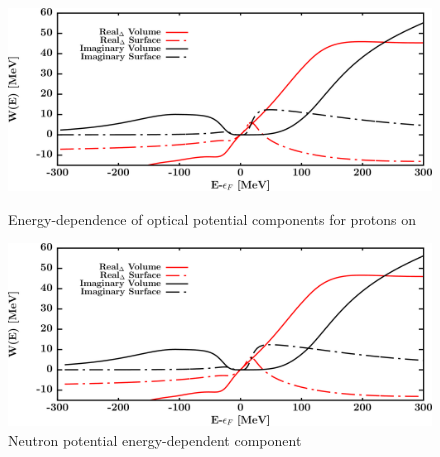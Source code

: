 \begin{figure}[H]
    \centering
    \begin{minipage}{0.45\textwidth}
        \centering
        \includegraphics[width=1.0\textwidth]{figures/ca40_protonPotentials.png}
        \caption{Energy-dependence of optical potential components for protons
        on \caForty}
        \label{DOMFitData_ca40_proton_potentialComponent_energy}
    \end{minipage}\hfill
    \begin{minipage}{0.45\textwidth}
        \centering
        \includegraphics[width=1.0\textwidth]{figures/ca40_neutronPotentials.png}
        \caption{Neutron potential energy-dependent component}
        \label{DOMFitData_ca40_neutron_potentialComponent_energy}
    \end{minipage}
\end{figure}

